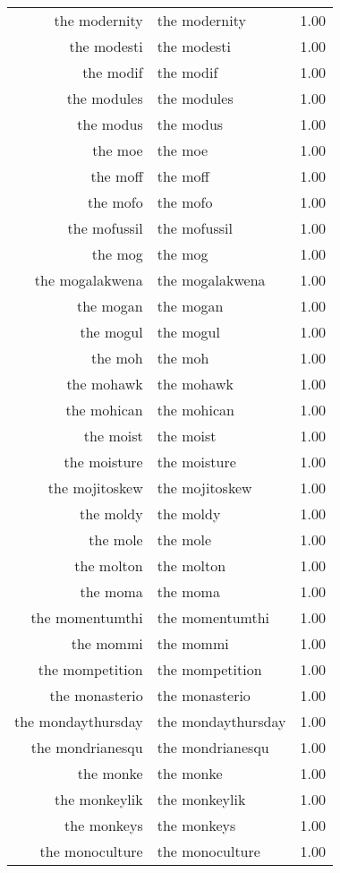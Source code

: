 \begin{table}[ht]
\begin{tabular}{rlr}
  the modernity & the modernity & 1.00 \\ 
  the modesti & the modesti & 1.00 \\ 
  the modif & the modif & 1.00 \\ 
  the modules & the modules & 1.00 \\ 
  the modus & the modus & 1.00 \\ 
  the moe & the moe & 1.00 \\ 
  the moff & the moff & 1.00 \\ 
  the mofo & the mofo & 1.00 \\ 
  the mofussil & the mofussil & 1.00 \\ 
  the mog & the mog & 1.00 \\ 
  the mogalakwena & the mogalakwena & 1.00 \\ 
  the mogan & the mogan & 1.00 \\ 
  the mogul & the mogul & 1.00 \\ 
  the moh & the moh & 1.00 \\ 
  the mohawk & the mohawk & 1.00 \\ 
  the mohican & the mohican & 1.00 \\ 
  the moist & the moist & 1.00 \\ 
  the moisture & the moisture & 1.00 \\ 
  the mojitoskew & the mojitoskew & 1.00 \\ 
  the moldy & the moldy & 1.00 \\ 
  the mole & the mole & 1.00 \\ 
  the molton & the molton & 1.00 \\ 
  the moma & the moma & 1.00 \\ 
  the momentumthi & the momentumthi & 1.00 \\ 
  the mommi & the mommi & 1.00 \\ 
  the mompetition & the mompetition & 1.00 \\ 
  the monasterio & the monasterio & 1.00 \\ 
  the mondaythursday & the mondaythursday & 1.00 \\ 
  the mondrianesqu & the mondrianesqu & 1.00 \\ 
  the monke & the monke & 1.00 \\ 
  the monkeylik & the monkeylik & 1.00 \\ 
  the monkeys & the monkeys & 1.00 \\ 
  the monoculture & the monoculture & 1.00 \\ 

\end{tabular}
\end{table}
